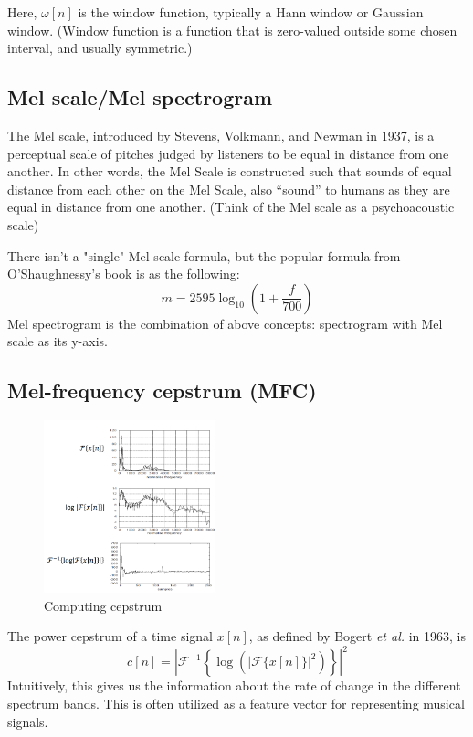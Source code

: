 \documentclass{article}
\theoremstyle{plain}
\theoremstyle{definition}
\theoremstyle{remark}
\begin{document}
	Here, $\omega[n]$ is the window function, typically a Hann window or Gaussian window.
	(Window function is a function that is zero-valued outside some chosen interval, and usually symmetric.)

	
\subsection{Mel scale/Mel spectrogram}
	The Mel scale, introduced by Stevens, Volkmann, and Newman in 1937, is a perceptual scale of pitches judged by listeners to be equal in distance from one another.
	In other words, the Mel Scale is constructed such that sounds of equal distance from each other on the Mel Scale, also “sound” to humans as they are equal in distance from one another.	
	(Think of the Mel scale as a psychoacoustic scale)

	There isn't a "single" Mel scale formula, but the popular formula from O'Shaughnessy's book is as the following:
	$$m = 2595 \log_{10} \left( 1 + \frac{f}{700} \right)$$	
	Mel spectrogram is the combination of above concepts: spectrogram with Mel scale as its y-axis.


\subsection{Mel-frequency cepstrum (MFC)}

\begin{figure}
  \begin{center}
    \includegraphics[height=5cm]{fig2.png}
  \end{center}
    \caption{Computing cepstrum}
\end{figure}

	The power cepstrum of a time signal $x[n]$, as defined by Bogert {\it et al.} in 1963, is 
	$$c[n] = \left| \mathcal{F}^{-1} \left\{ \log \left( |\mathcal{F} \{x[n]\}|^2 \right) \right\} \right|^2$$
	Intuitively, this gives us the information about the rate of change in the different spectrum bands.
	This is often utilized as a feature vector for representing musical signals.
	
\end{document}
